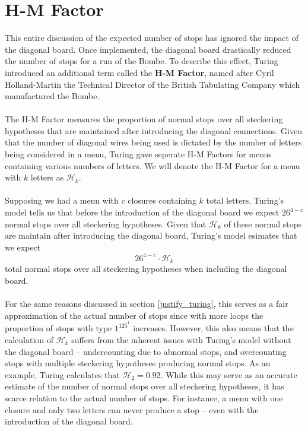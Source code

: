 \section{H-M Factor}
This entire discussion of the expected number of stops has ignored the impact of the diagonal board. Once implemented, the diagonal board drastically reduced the number of stops for a run of the Bombe. To describe this effect, Turing introduced an additional term called the {\bf{H-M Factor}}, named after Cyril Holland-Martin the Technical Director of the British Tabulating Company which manufactured the Bombe.
\\\\The H-M Factor measures the proportion of normal stops over all steckering hypotheses that are maintained after introducing the diagonal connections. Given that the number of diagonal wires being used is dictated by the number of letters being considered in a menu, Turing gave seperate H-M Factors for menus containing various numbers of letters. We will denote the H-M Factor for a menu with $k$ letters as $\mathcal{H}_k$. 
\\\\Supposing we had a menu with $c$ closures containing $k$ total letters. Turing's model tells us that before the introduction of the diagonal board we expect $26^{4-c}$ normal stops over all steckering hypotheses. Given that $\mathcal{H}_k$ of these normal stops are maintain after introducing the diagonal board, Turing's model esimates that we expect 
\[
    26^{4-c}\cdot\mathcal{H}_k
\]
total normal stops over all steckering hypotheses when including the diagonal board. 
\\\\For the same reasons discussed in section \ref{justify_turing}, this serves as a fair approximation of the actual number of stops since with more loops the proportion of stops with type $1^125^1$ increases. However, this also means that the calculation of $\mathcal{H}_k$ suffers from the inherent issues with Turing's model without the diagonal board -- undercounting due to abnormal stops, and overcounting stops with multiple steckering hypotheses producing normal stops. As an example, Turing calculates that $\mathcal{H}_2 = 0.92$. While this may serve as an accurate estimate of the number of normal stops over all steckering hypotheses, it has scarce relation to the actual number of stops. For instance, a menu with one closure and only two letters can never produce a stop -- even with the introduction of the diagonal board. 
